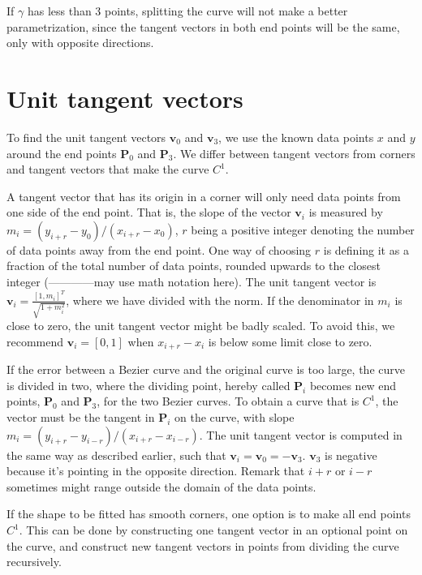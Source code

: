 \documentclass[10pt]{article}
\begin{document}
If $\gamma$ has less than 3 points, splitting the curve will not make a better parametrization, since the tangent vectors in both end points will be the same, only with opposite directions.


\section*{Unit tangent vectors}
To find the unit tangent vectors $\mathbf{v}_0$ and $\mathbf{v}_3$, we use the known data points $x$ and $y$ around the end points $\mathbf{P}_0$ and $\mathbf{P}_3$. We differ between tangent vectors from corners and tangent vectors that make the curve $C^1$.

A tangent vector that has its origin in a corner will only need data points from one side of the end point. That is, the slope of the vector $\mathbf{v}_i$ is measured by $m_i = (y_{i+r} - y_0)/(x_{i+r} - x_0)$, $r$ being a positive integer denoting the number of data points away from the end point. One way of choosing $r$ is defining it as a fraction of the total number of data points, rounded upwards to the closest integer (------------may use math notation here).
 The unit tangent vector is  $\mathbf{v}_i = \frac{[1, m_i]^T}{\sqrt{1+m_i^2}}$, where we have divided with the norm. If the denominator in $m_i$ is close to zero, the unit tangent vector might be badly scaled. To avoid this, we recommend $\mathbf{v}_i = [0,1]$ when $x_{i+r} - x_i$ is below some limit close to zero. 

If the error between a Bezier curve and the original curve is too large, the curve is divided in two, where the dividing point, hereby called $\mathbf{P}_i$ becomes new end points, $\mathbf{P}_0$ and $\mathbf{P}_3$, for the two Bezier curves. To obtain a curve that is $C^1$, the vector must be the tangent in $\mathbf{P}_i$ on the curve, with slope $m_i = (y_{i+r} - y_{i-r})/(x_{i+r} - x_{i-r})$. The unit tangent vector is computed in the same way as described earlier, such that $\mathbf{v}_i = \mathbf{v}_0 = -\mathbf{v}_3$. $\mathbf{v}_3$ is negative because it's pointing in the opposite direction. Remark that $i+r$ or $i-r$ sometimes might range outside the domain of the data points. 

If the shape to be fitted has smooth corners, one option is to make all end points $C^1$. This can be done by constructing one tangent vector in an optional point on the curve, and construct new tangent vectors in points from dividing the curve recursively.
\end{document}
